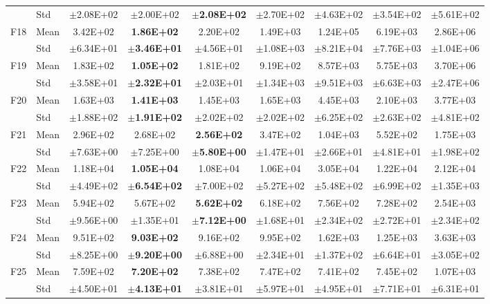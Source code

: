 \begin{table}[htbp]
{\begin{tabular}{clccccccc}
 & Std & $\pm$2.08E+02 & $\pm$2.00E+02 & $\pm$\textbf{2.08E+02} & $\pm$2.70E+02 & $\pm$4.63E+02 & $\pm$3.54E+02 & $\pm$5.61E+02 \\
F18 & Mean & 3.42E+02 & \textbf{1.86E+02} & 2.20E+02 & 1.49E+03 & 1.24E+05 & 6.19E+03 & 2.86E+06 \\
 & Std & $\pm$6.34E+01 & $\pm$\textbf{3.46E+01} & $\pm$4.56E+01 & $\pm$1.08E+03 & $\pm$8.21E+04 & $\pm$7.76E+03 & $\pm$1.04E+06 \\
F19 & Mean & 1.83E+02 & \textbf{1.05E+02} & 1.81E+02 & 9.19E+02 & 8.57E+03 & 5.75E+03 & 3.70E+06 \\
 & Std & $\pm$3.58E+01 & $\pm$\textbf{2.32E+01} & $\pm$2.03E+01 & $\pm$1.34E+03 & $\pm$9.51E+03 & $\pm$6.63E+03 & $\pm$2.47E+06 \\
F20 & Mean & 1.63E+03 & \textbf{1.41E+03} & 1.45E+03 & 1.65E+03 & 4.45E+03 & 2.10E+03 & 3.77E+03 \\
 & Std & $\pm$1.88E+02 & $\pm$\textbf{1.91E+02} & $\pm$2.02E+02 & $\pm$2.02E+02 & $\pm$6.25E+02 & $\pm$2.63E+02 & $\pm$4.81E+02 \\
F21 & Mean & 2.96E+02 & 2.68E+02 & \textbf{2.56E+02} & 3.47E+02 & 1.04E+03 & 5.52E+02 & 1.75E+03 \\
 & Std & $\pm$7.63E+00 & $\pm$7.25E+00 & $\pm$\textbf{5.80E+00} & $\pm$1.47E+01 & $\pm$2.66E+01 & $\pm$4.81E+01 & $\pm$1.98E+02 \\
F22 & Mean & 1.18E+04 & \textbf{1.05E+04} & 1.08E+04 & 1.06E+04 & 3.05E+04 & 1.22E+04 & 2.12E+04 \\
 & Std & $\pm$4.49E+02 & $\pm$\textbf{6.54E+02} & $\pm$7.00E+02 & $\pm$5.27E+02 & $\pm$5.48E+02 & $\pm$6.99E+02 & $\pm$1.35E+03 \\
F23 & Mean & 5.94E+02 & 5.67E+02 & \textbf{5.62E+02} & 6.18E+02 & 7.56E+02 & 7.28E+02 & 2.54E+03 \\
 & Std & $\pm$9.56E+00 & $\pm$1.35E+01 & $\pm$\textbf{7.12E+00} & $\pm$1.68E+01 & $\pm$2.34E+02 & $\pm$2.72E+01 & $\pm$2.34E+02 \\
F24 & Mean & 9.51E+02 & \textbf{9.03E+02} & 9.16E+02 & 9.95E+02 & 1.62E+03 & 1.25E+03 & 3.63E+03 \\
 & Std & $\pm$8.25E+00 & $\pm$\textbf{9.20E+00} & $\pm$6.88E+00 & $\pm$2.34E+01 & $\pm$1.37E+02 & $\pm$6.64E+01 & $\pm$3.05E+02 \\
F25 & Mean & 7.59E+02 & \textbf{7.20E+02} & 7.38E+02 & 7.47E+02 & 7.41E+02 & 7.45E+02 & 1.07E+03 \\
 & Std & $\pm$4.50E+01 & $\pm$\textbf{4.13E+01} & $\pm$3.81E+01 & $\pm$5.97E+01 & $\pm$4.95E+01 & $\pm$7.71E+01 & $\pm$6.31E+01 \\

\end{tabular}}
\end{table}
